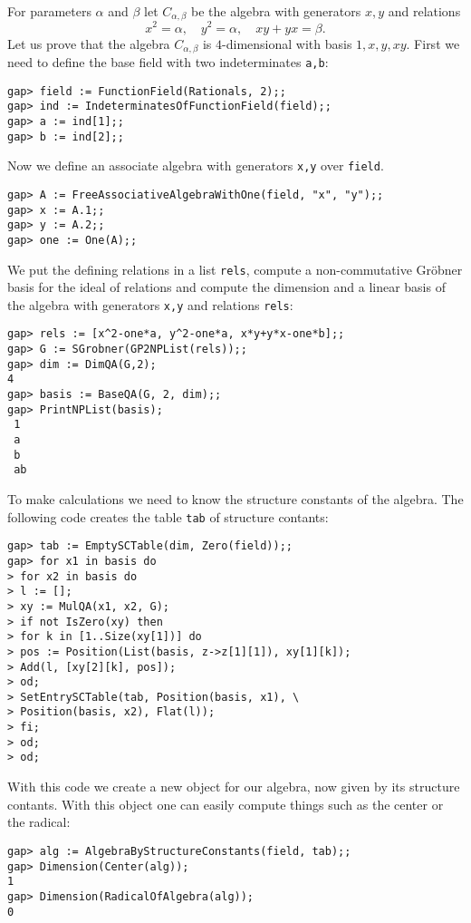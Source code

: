 \begin{example}
	\label{example:Clifford}
	For parameters $\alpha$ and $\beta$ let $C_{\alpha,\beta}$ be the algebra
	with generators $x,y$ and relations 
	\[
		x^2=\alpha,\quad
		y^2=\alpha,\quad
		xy+yx=\beta.
	\]
	Let us prove that the algebra $C_{\alpha,\beta}$ is $4$-dimensional with
	basis $1,x,y,xy$.  First we need to define the base field with two
	indeterminates \lstinline{a,b}:
\begin{lstlisting}
gap> field := FunctionField(Rationals, 2);;
gap> ind := IndeterminatesOfFunctionField(field);;
gap> a := ind[1];;
gap> b := ind[2];;
\end{lstlisting}
Now we define an associate algebra with generators \lstinline{x,y} over \lstinline{field}. 
\begin{lstlisting}
gap> A := FreeAssociativeAlgebraWithOne(field, "x", "y");;
gap> x := A.1;;
gap> y := A.2;;
gap> one := One(A);;
\end{lstlisting}
We put the defining relations in a list \lstinline{rels}, compute a
non-commutative Gr\"obner basis for the ideal of relations and compute the
dimension and a linear basis of the algebra with generators \lstinline{x,y} and
relations
\lstinline{rels}:
\begin{lstlisting}
gap> rels := [x^2-one*a, y^2-one*a, x*y+y*x-one*b];;
gap> G := SGrobner(GP2NPList(rels));;
gap> dim := DimQA(G,2);
4
gap> basis := BaseQA(G, 2, dim);;
gap> PrintNPList(basis);
 1 
 a 
 b 
 ab 
\end{lstlisting}

To make calculations we need to know the structure constants of the algebra.
The following code creates the table \lstinline{tab} of structure contants:
\begin{lstlisting}
gap> tab := EmptySCTable(dim, Zero(field));;
gap> for x1 in basis do
> for x2 in basis do
> l := [];
> xy := MulQA(x1, x2, G);
> if not IsZero(xy) then 
> for k in [1..Size(xy[1])] do
> pos := Position(List(basis, z->z[1][1]), xy[1][k]);
> Add(l, [xy[2][k], pos]);
> od;
> SetEntrySCTable(tab, Position(basis, x1), \
> Position(basis, x2), Flat(l));
> fi;
> od;
> od;
\end{lstlisting}

With this code we create a new object for our algebra, now given by its
structure contants.  With this object one can easily compute things such as the
center or the radical: 
\begin{lstlisting}
gap> alg := AlgebraByStructureConstants(field, tab);;
gap> Dimension(Center(alg));
1
gap> Dimension(RadicalOfAlgebra(alg));
0
\end{lstlisting}
\end{example}

